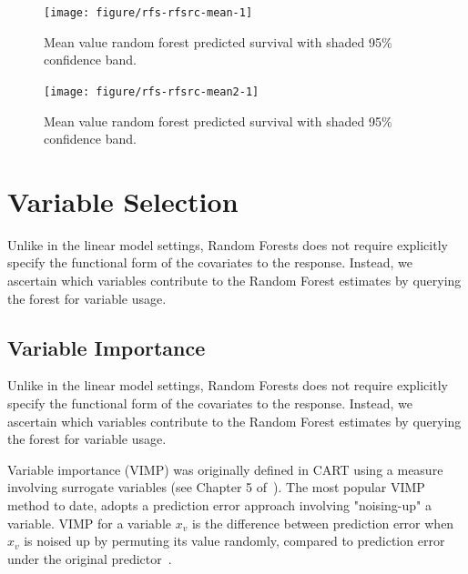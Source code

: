 \documentclass[nojss]{jss}\usepackage[]{graphicx}\usepackage[]{color}
\begin{document}
\begin{Schunk}
\begin{figure}[!htpb]

{\centering \texttt{[image: figure/rfs-rfsrc-mean-1]} 

}

\caption[Mean value random forest predicted survival with shaded 95\% confidence band]{Mean value random forest predicted survival with shaded 95\% confidence band.\label{fig:rfsrc-mean}}
\end{figure}
\end{Schunk}

\begin{Schunk}
\begin{figure}[!htpb]

{\centering \texttt{[image: figure/rfs-rfsrc-mean2-1]} 

}

\caption[Mean value random forest predicted survival with shaded 95\% confidence band]{Mean value random forest predicted survival with shaded 95\% confidence band.\label{fig:rfsrc-mean2}}
\end{figure}
\end{Schunk}



\section{Variable Selection}\label{S:variableselection}
Unlike in the linear model settings, Random Forests does not require explicitly specify the functional form of the covariates to the response. Instead, we ascertain which variables contribute to the Random Forest estimates by querying the forest for variable usage. 

\subsection{Variable Importance}\label{S:vimp}
Unlike in the linear model settings, Random Forests does not require explicitly specify the functional form of the covariates to the response. Instead, we ascertain which variables contribute to the Random Forest estimates by querying the forest for variable usage. 

Variable importance (VIMP) was originally defined in CART using a measure involving surrogate variables (see Chapter 5 of~\cite{cart:1984}). The most popular VIMP method to date, adopts a prediction error approach involving "noising-up" a variable. VIMP for a variable $x_v$ is the difference between prediction error when $x_v$ is noised up by permuting its value randomly, compared to prediction error under the original predictor~\citep{Breiman:2001, liaw:2002, Ishwaran:2007, Ishwaran:2008}.
\end{document}
